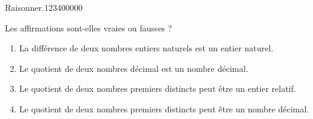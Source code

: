 \begin{pageAD}
 
\begin{ExoCad}{Raisonner.}{1234}{0}{0}{0}{0}{0}

Les affirmations sont-elles vraies ou fausses ?
\begin{enumerate}[leftmargin=*]
\item La différence de deux nombres entiers naturels est un entier naturel. 
\item Le quotient de deux nombres décimal est un nombre décimal. 
\item Le quotient de deux nombres premiers distincts peut être un entier relatif. 
\item Le quotient de deux nombres premiers distincts peut être un nombre décimal. 
\end{enumerate} 
 
 \end{ExoCad}
 
\end{pageAD}


